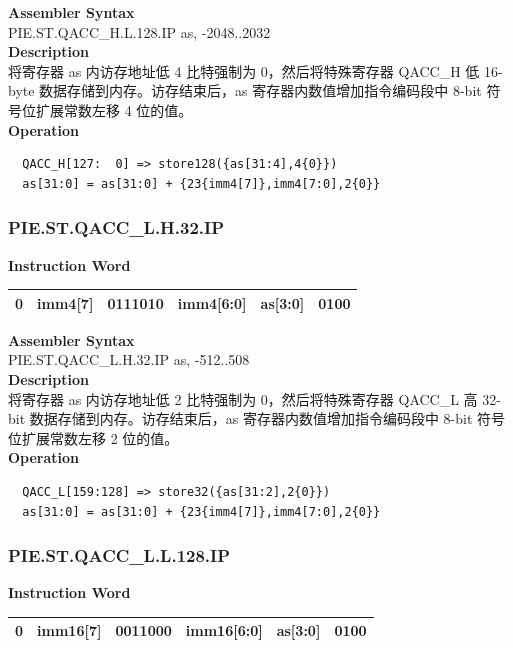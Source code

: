 \textbf{Assembler Syntax} \\
PIE.ST.QACC\_H.L.128.IP as, -2048..2032 \\
\textbf{Description} \\
将寄存器 as 内访存地址低 4 比特强制为 0，然后将特殊寄存器 QACC\_H 低 16-byte 数据存储到内存。访存结束后，as 寄存器内数值增加指令编码段中 8-bit 符号位扩展常数左移 4 位的值。\\
\textbf{Operation}
\begin{lstlisting}
  QACC_H[127:  0] => store128({as[31:4],4{0}})
  as[31:0] = as[31:0] + {23{imm4[7]},imm4[7:0],2{0}}
\end{lstlisting}

\newpage
\subsubsection{PIE.ST.QACC\_L.H.32.IP}\label{instruction:PIESTQACCLH32IP}
\setlength\tabcolsep{6pt}
\textbf{Instruction Word} \\
\begin{tabular}{|c|c|c|c|c|c|}
	\hline
	0 & imm4[7] & 0111010 & imm4[6:0] & as[3:0] & 0100 \\
	\hline
\end{tabular}

\textbf{Assembler Syntax} \\
PIE.ST.QACC\_L.H.32.IP as, -512..508 \\
\textbf{Description} \\
将寄存器 as 内访存地址低 2 比特强制为 0，然后将特殊寄存器 QACC\_L 高 32-bit 数据存储到内存。访存结束后，as 寄存器内数值增加指令编码段中 8-bit 符号位扩展常数左移 2 位的值。\\
\textbf{Operation}
\begin{lstlisting}
  QACC_L[159:128] => store32({as[31:2],2{0}})
  as[31:0] = as[31:0] + {23{imm4[7]},imm4[7:0],2{0}}
\end{lstlisting}

\newpage
\subsubsection{PIE.ST.QACC\_L.L.128.IP}\label{instruction:PIESTQACCLL128IP}
\setlength\tabcolsep{6pt}
\textbf{Instruction Word} \\
\begin{tabular}{|c|c|c|c|c|c|}
	\hline
	0 & imm16[7] & 0011000 & imm16[6:0] & as[3:0] & 0100 \\
	\hline
\end{tabular}

